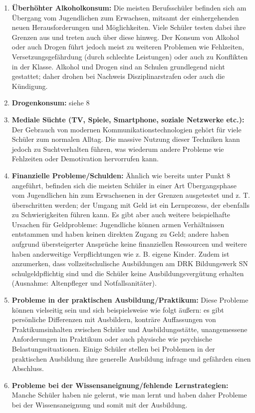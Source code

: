 \begin{enumerate}
	\item \textbf{Überhöhter Alkoholkonsum:} Die meisten Berufsschüler befinden sich am Übergang vom Jugendlichen zum Erwachsen, mitsamt der einhergehenden neuen Herausforderungen und Möglichkeiten. Viele Schüler testen dabei ihre Grenzen aus und treten auch über diese hinweg. Der Konsum von Alkohol oder auch Drogen führt jedoch meist zu weiteren Problemen wie Fehlzeiten, Versetzungsgefährdung (durch schlechte Leistungen) oder auch zu Konflikten in der Klasse. Alkohol und Drogen sind an Schulen grundlegend nicht gestattet; daher drohen bei Nachweis Disziplinarstrafen oder auch die Kündigung.
	\item \textbf{Drogenkonsum:} siehe 8
	\item \textbf{Mediale Süchte (TV, Spiele, Smartphone, soziale Netzwerke etc.):} Der Gebrauch von modernen Kommunikationstechnologien gehört für viele Schüler zum normalen Alltag. Die massive Nutzung dieser Techniken kann jedoch zu Suchtverhalten führen, was wiederum andere Probleme wie Fehlzeiten oder Demotivation hervorrufen kann.
	\item \textbf{Finanzielle Probleme/Schulden:} Ähnlich wie bereits unter Punkt 8 angeführt, befinden sich die meisten Schüler in einer Art Übergangsphase vom Jugendlichen hin zum Erwachsenen in der Grenzen ausgetestet und z. T. überschritten werden; der Umgang mit Geld ist ein Lernprozess, der ebenfalls zu Schwierigkeiten führen kann. Es gibt aber auch weitere beispielhafte Ursachen für Geldprobleme: Jugendliche können armen Verhältnissen entstammen und haben keinen direkten Zugang zu Geld; andere haben aufgrund übersteigerter Ansprüche keine finanziellen Ressourcen und weitere haben anderweitige Verpflichtungen wie z. B. eigene Kinder. Zudem ist anzumerken, dass vollzeitschulische Ausbildungen am DRK Bildungswerk SN schulgeldpflichtig sind und die Schüler keine Ausbildungsvergütung erhalten (Ausnahme: Altenpfleger und Notfallsanitäter).
	\item \textbf{Probleme in der praktischen Ausbildung/Praktikum:} Diese Probleme können vielseitig sein und sich beispielsweise wie folgt äußern: es gibt persönliche Differenzen mit Ausbildern, konträre Auffassungen von Praktikumsinhalten zwischen Schüler und Ausbildungsstätte, unangemessene Anforderungen im Praktikum oder auch physische wie psychische Belastungssituationen. Einige Schüler stellen bei Problemen in der praktischen Ausbildung ihre generelle Ausbildung infrage und gefährden einen Abschluss.  
	\item \textbf{Probleme bei der Wissensaneignung/fehlende Lernstrategien:} Manche Schüler haben nie gelernt, wie man lernt und haben daher Probleme bei der Wissensaneignung und somit mit der Ausbildung.

\end{enumerate}
